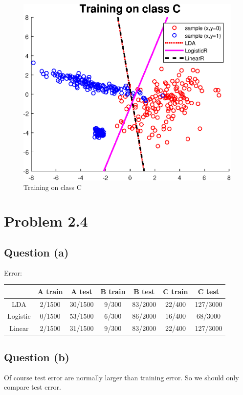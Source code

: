 \documentclass{article}
\begin{document}
	\begin{figure}
		\centering
		\includegraphics[scale=0.6]{plot_c.eps}
		\caption{Training on class C}
		\label{fig:c}
	\end{figure}

	\section{Problem 2.4}
	\subsection{Question (a)}
	Error:
	\begin{center}
		\begin{tabular}{ c | c | c | c | c | c | c }
			\hline
			 & A train & A test & B train & B test & C train & C test \\ \hline
			LDA & 2/1500 & 30/1500 & 9/300 & 83/2000 & 22/400 & 127/3000 \\ \hline
			Logistic & 0/1500 & 53/1500 & 6/300 & 86/2000 & 16/400 & 68/3000  \\ \hline
			Linear & 2/1500 & 31/1500 & 9/300 & 83/2000 & 22/400 & 127/3000  \\ \hline
		\end{tabular}
	\end{center}

	\subsection{Question (b)}
	Of course test error are normally larger than training error. So we should only compare test error.
	
\end{document}

